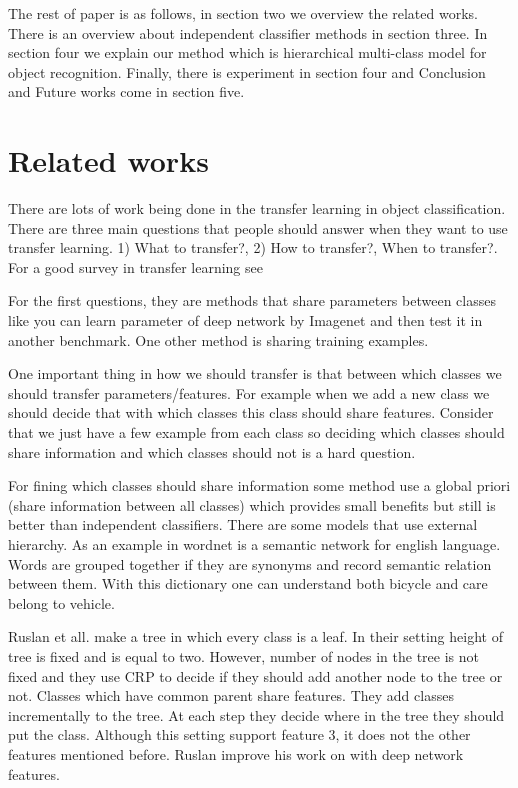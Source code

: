 \documentclass[10pt,twocolumn,letterpaper]{article}
\begin{document}
The rest of paper is as follows, in section two we overview the related works. There is an overview about independent classifier methods in section three. In section four we explain our method which is hierarchical multi-class model for object recognition. Finally, there is experiment in section four and Conclusion and Future works come in section five.


\section{Related works}

There are lots of work being done in the transfer learning in object classification. There are three main questions that people should answer when they want to use transfer learning. 1) What to transfer?,  2) How to transfer?, When to transfer?. For a good survey in transfer learning see \cite{transfersurvey}

For the first questions, they are methods that share parameters between classes like you can learn parameter of deep network \cite{deepnetwork} by Imagenet \cite{imagenet} and then test it in another benchmark. One other method is sharing training examples. 

One important thing in how we should transfer is that between which classes we should transfer parameters/features. For example when we add a new class we should decide that with which classes this class should share features. Consider that we just have a few example from each class so deciding which classes should share information and which classes should not is a hard question.

For fining which classes should share information some method use a global priori \cite{priori} (share information between all classes) which provides small benefits but still is better than independent classifiers. There are some models \cite{semantic} that use external hierarchy. As an example in \cite{semantic} wordnet \cite{wordnet} is a semantic network for english language. Words are grouped together if they are synonyms and record semantic relation between them. With this dictionary one can understand both bicycle and care belong to vehicle.



Ruslan et all. \cite{ruslan}  make a tree in which every class is a leaf. In their setting height of tree is fixed and is equal to two. However, number of nodes in the tree is not fixed and they use CRP to decide if they should add another node to the tree or not. Classes which have common parent share features. They add classes incrementally to the tree. At each step they decide where in the tree they should put the class. Although this setting support feature 3, it does not the other features mentioned before. Ruslan improve his work on \cite{ruslan2} with deep network features.
\end{document}
